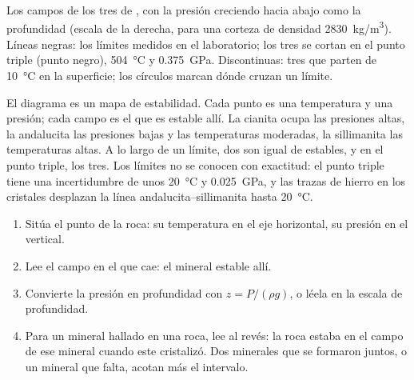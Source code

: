 \begin{omfigure}
{\small Los campos de los tres  de , con la presión
creciendo hacia abajo como la profundidad (escala de la derecha, para una
corteza de densidad \qty{2830}{kg/m^3}). Líneas negras: los límites medidos en
el laboratorio; los tres se cortan en el punto triple (punto negro),
\qty{504}{\celsius} y \qty{0.375}{GPa}. Discontinuas: tres  que parten
de \qty{10}{\celsius} en la superficie; los círculos marcan dónde cruzan un
límite.}
\end{omfigure}

El diagrama es un mapa de estabilidad. Cada punto es una temperatura y una
presión; cada campo es el  que es estable allí. La cianita ocupa las
presiones altas, la andalucita las presiones bajas y las temperaturas
moderadas, la sillimanita las temperaturas altas. A lo largo de un límite, dos
 son igual de estables, y en el punto triple, los tres. Los límites
no se conocen con exactitud: el punto triple tiene una incertidumbre de unos
\qty{20}{\celsius} y \qty{0.025}{GPa}, y las trazas de hierro en los cristales
desplazan la línea andalucita--sillimanita hasta \qty{20}{\celsius}.

\begin{method}\label{met:g12:metamorphic-rocks:pt}
\begin{enumerate}
  \item Sitúa el punto de la roca: su temperatura en el eje horizontal, su
        presión en el vertical.
  \item Lee el campo en el que cae: el mineral estable allí.
  \item Convierte la presión en profundidad con $z = P/(\rho g)$, o léela en
        la escala de profundidad.
  \item Para un mineral hallado en una roca, lee al revés: la roca estaba en
        el campo de ese mineral cuando este cristalizó. Dos minerales que se
        formaron juntos, o un mineral que falta, acotan más el intervalo.
\end{enumerate}
\end{method}

